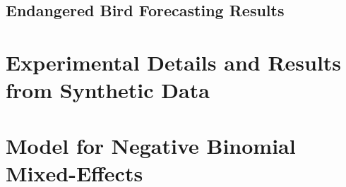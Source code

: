 \documentclass{article}
\begin{document}
\subsection{Endangered Bird Forecasting Results}
\label{supp:results_birds}



\section{Experimental Details and Results from Synthetic Data}
\label{supp:synth1D}


% 

\section{Model for Negative Binomial Mixed-Effects}
\label{supp:model_negbinom}

\end{document}
